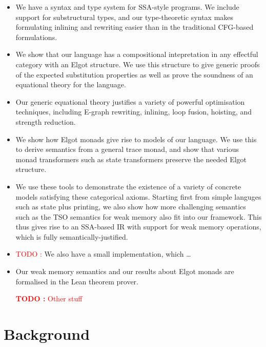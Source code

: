 \documentclass[acmsmall,screen,review]{acmart}
\newcounter{todos}
\newcommand{\TODO}[1]{{
  \stepcounter{todos}
  \begin{center}\large{\textcolor{red}{\textbf{TODO \arabic{todos}:} #1}}\end{center}
}}
\newcommand{\todo}[1]{\stepcounter{todos} \textcolor{red}{TODO \arabic{todos}:} #1}
\begin{document}
\begin{itemize}
\item We have a syntax and type system for SSA-style programs. We include support for substructural types, and our type-theoretic syntax makes formulating inlining and rewriting easier than in the traditional CFG-based formulations. 
\item We show that our language has a compositional intepretation in any effectful category with an Elgot structure. We use this structure to give generic proofs of the expected substitution properties as well as prove the soundness of an equational theory for the language.
\item Our generic equational theory justifies a variety of powerful optimisation techniques, including E-graph rewriting, inlining, loop fusion, hoisting, and strength reduction. 
\item We show how Elgot monads give rise to models of our language. We use this to derive semantics from a general trace monad, and show that various monad transformers such as state transformers preserve the needed Elgot structure. 
\item We use these tools to demonstrate the existence of a variety of concrete models satisfying these categorical axioms. Starting first from simple languges such as state plus printing, we also show how more challenging semantics such as the TSO semantics for weak memory also fit into our framework. This thus gives rise to an SSA-based IR with support for weak memory operations, which is fully semantically-justified.
\item \todo{We also have a small implementation, which \ldots}
\item Our weak memory semantics and our results about Elgot monads are formalised in the Lean theorem prover. \TODO{Other stuff}
\end{itemize}

\section{Background}
\end{document}
